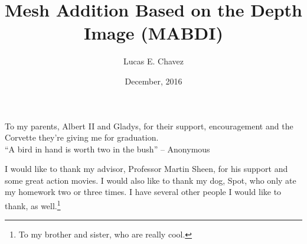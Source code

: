 \documentclass[botnum, nobox]{unmeethesis}
\begin{document}
\frontmatter




\title{Mesh Addition Based on the Depth Image (MABDI)}

\author{Lucas E. Chavez}





\date{December, 2016}

\maketitle

\begin{dedication}
   To my parents, Albert II and Gladys, for their support,
   encouragement and the Corvette they're giving me for graduation. \\[3ex]
   ``A bird in hand is worth two in the bush''
         -- Anonymous
\end{dedication}

\begin{acknowledgments}
   \vspace{1.1in}
   I would like to thank my advisor, Professor Martin Sheen, for his support
   and some great action movies.  I would also like to thank my dog, Spot,
   who only ate my homework two or three times.  I have several other people
   I would like to thank, as well.\footnote{To my brother and sister, who
   are really cool.}
\end{acknowledgments}

\maketitleabstract %
\end{document}
